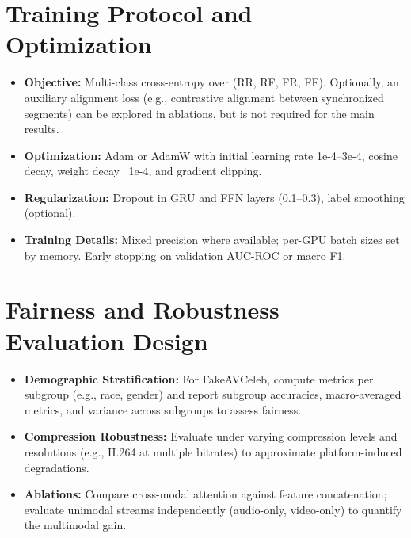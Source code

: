 \section{Training Protocol and Optimization}
\begin{itemize}
    \item \textbf{Objective:} Multi-class cross-entropy over (RR, RF, FR, FF). Optionally, an auxiliary alignment loss (e.g., contrastive alignment between synchronized segments) can be explored in ablations, but is not required for the main results.
    \item \textbf{Optimization:} Adam or AdamW with initial learning rate 1e-4–3e-4, cosine decay, weight decay ~1e-4, and gradient clipping. \cite{loshchilov2019adamw}
    \item \textbf{Regularization:} Dropout in GRU and FFN layers (0.1–0.3), label smoothing (optional).
    \item \textbf{Training Details:} Mixed precision where available; per-GPU batch sizes set by memory. Early stopping on validation AUC-ROC or macro F1.
\end{itemize}

\section{Fairness and Robustness Evaluation Design}
\begin{itemize}
    \item \textbf{Demographic Stratification:} For FakeAVCeleb, compute metrics per subgroup (e.g., race, gender) and report subgroup accuracies, macro-averaged metrics, and variance across subgroups to assess fairness.
    \item \textbf{Compression Robustness:} Evaluate under varying compression levels and resolutions (e.g., H.264 at multiple bitrates) to approximate platform-induced degradations.
    \item \textbf{Ablations:} Compare cross-modal attention against feature concatenation; evaluate unimodal streams independently (audio-only, video-only) to quantify the multimodal gain.
\end{itemize}

